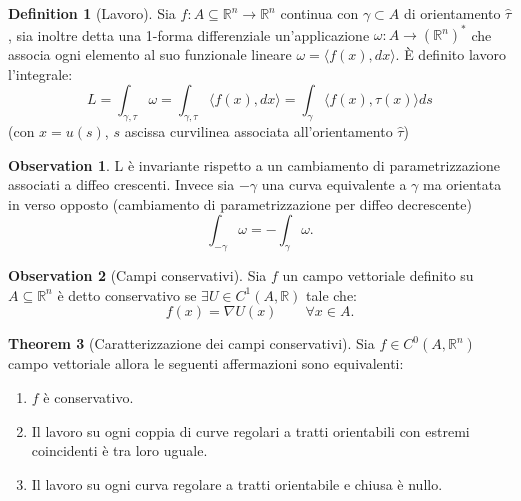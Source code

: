 \documentclass[leqno]{article}
\theoremstyle{definition}
\newtheorem{definition}{Definition}[section]
\numberwithin{equation}{section}
\newtheorem{theorem}{Theorem}[section]
\newtheorem{observation}[theorem]{Observation}
\theoremstyle{remark}
\begin{document}
	\begin{definition}[Lavoro]
		Sia $f: A \subseteq \mathbb{R}^n \to \mathbb{R}^n$ continua con $\gamma \subset A$ di orientamento $\hat{\tau}$, sia inoltre detta una 1-forma differenziale un'applicazione $\omega : A \to \left(\mathbb{R}^n\right)^*$ che associa ogni elemento al suo funzionale lineare $\omega=\langle f(x), dx \rangle$. È definito lavoro l'integrale:
		\begin{equation}
			L=\int_{\gamma,\tau}\omega=\int_{\gamma,\tau}\langle f(x),dx\rangle =\int_{\gamma}\langle f(x),\tau(x)\rangle ds
		\end{equation}
		(con $x=u(s)$, $s$ ascissa curvilinea associata all'orientamento $\hat{\tau}$)
		\begin{observation}
			L è invariante rispetto a un cambiamento di parametrizzazione associati a diffeo crescenti. Invece sia $-\gamma$ una curva equivalente a $\gamma$ ma orientata in verso opposto (cambiamento di parametrizzazione per diffeo decrescente)
			\begin{equation}
				\int_{-\gamma}\omega=-\int_{\gamma}\omega.
			\end{equation}
		\end{observation}
		\begin{observation}[Campi conservativi]
			Sia $f$ un campo vettoriale definito su $A\subseteq\mathbb{R}^n$ è detto conservativo se $\exists U \in C^1(A,\mathbb{R})$ tale che:
			\begin{equation}
				f(x)=\nabla U(x) \quad \quad \forall x\in A.
			\end{equation}
			
			
			
		\end{observation}
	\end{definition}
	\begin{theorem}[Caratterizzazione dei campi conservativi]
		Sia $f\in C^0(A,\mathbb{R}^n)$ campo vettoriale allora le seguenti affermazioni sono equivalenti:
		\begin{enumerate}
			\item $f$ è conservativo.
			\item Il lavoro su ogni coppia di curve regolari a tratti orientabili con estremi coincidenti è tra loro uguale.
			\item Il lavoro su ogni curva regolare a tratti orientabile e chiusa è nullo.
		\end{enumerate}
	\end{theorem}
\end{document}

